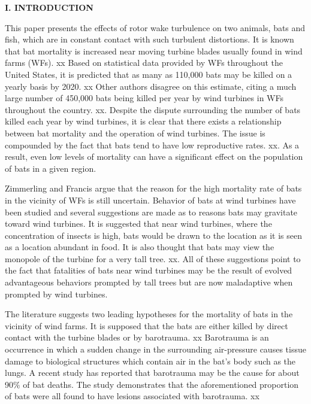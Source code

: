 \documentclass{article}
\begin{document}
\normalsize
\vspace{8cm}
\begin{multicols}{2}
\noindent\textbf{I. INTRODUCTION}

\vspace{0.1cm}
This paper presents the effects of rotor wake turbulence on two animals, bats and fish, which are in constant contact with such turbulent distortions. It is known that bat mortality is increased near moving turbine blades usually found in wind farms (WFs). xx  Based on statistical data provided by WFs throughout the United States, it is predicted that as many as 110,000 bats may be killed on a yearly basis by 2020. xx Other authors disagree on this estimate, citing a much large number of 450,000 bats being killed per year by wind turbines in WFs throughout the country. xx. Despite the dispute surrounding the number of bats killed each year by wind turbines, it is clear that there exists a relationship between bat mortality and the operation of wind turbines. The issue is compounded by the fact that bats tend to have low reproductive rates. xx. As a result, even low levels of mortality can have a significant effect on the population of bats in a given region.

Zimmerling and Francis argue that the reason for the high mortality rate of bats in the vicinity of WFs is still uncertain. Behavior of bats at wind turbines have been studied and several suggestions are made as to reasons bats may gravitate toward wind turbines. It is suggested that near wind turbines, where the concentration of insects is high, bats would be drawn to the location as it is seen as a location abundant in food. It is also thought that bats may view the monopole of the turbine for a very tall tree. xx. All of these suggestions point to the fact that fatalities of bats near wind turbines may be the result of evolved advantageous behaviors prompted by tall trees but are now maladaptive when prompted by wind turbines.

The literature suggests two leading hypotheses for the mortality of bats in the vicinity of wind farms. It is supposed that the bats are either killed by direct contact with the turbine blades or by barotrauma. xx Barotrauma is an occurrence in which a sudden change in the surrounding air-pressure causes tissue damage to biological structures which contain air in the bat's body such as the lungs. A recent study has reported that barotrauma may be the cause for about 90$\%$ of bat deaths. The study demonstrates that the aforementioned proportion of bats were all found to have lesions associated with barotrauma. xx 


\end{multicols}
\end{document}
